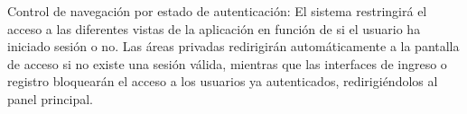 \begin{functional}
    \item[RF-18.-] Control de navegación por estado de autenticación: El sistema restringirá el acceso a las diferentes vistas de la aplicación en función de si el usuario ha iniciado sesión o no. Las áreas privadas redirigirán automáticamente a la pantalla de acceso si no existe una sesión válida, mientras que las interfaces de ingreso o registro bloquearán el acceso a los usuarios ya autenticados, redirigiéndolos al panel principal.
\end{functional}